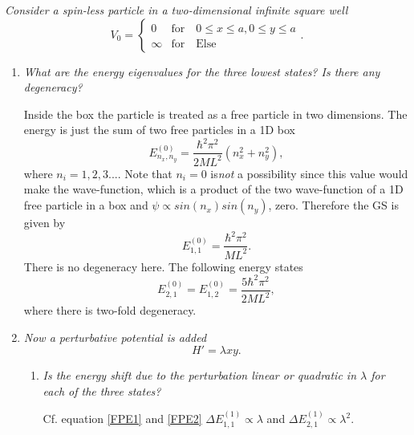 \begin{example}
	\emph{Consider a spin-less particle in a two-dimensional infinite square well}
	\begin{equation}
		V_0=\begin{cases} 0 &\mbox{for} \quad 0\leq x\leq a, 0\leq y \leq a \\ 
			\infty & \mbox{for} \quad \mbox{Else}  \end{cases}. 
	\end{equation} 
	
	\begin{enumerate}
		\item \emph{What are the energy eigenvalues for the three lowest states? Is there any degeneracy?}\newline
		
		Inside the box the particle is treated as a free particle in two dimensions. The energy is just the sum of two free particles in a 1D box
		\begin{equation}
			E_{n_x,n_y}^{(0)}=\frac{\hbar^2\pi^2}{2ML^2}(n_x^2+n_y^2),
		\end{equation} 
		where $n_i=1,2,3...$. Note that $n_i=0$ is\emph{not} a possibility since this value would make the wave-function, which is a product of the two wave-function of a 1D free particle in a box and $\psi\propto sin(n_x)sin(n_y)$, zero. Therefore the GS is given by
		\begin{equation}
			E_{1,1}^{(0)}=\frac{\hbar^2\pi^2}{ML^2}.
		\end{equation} 
		There is no degeneracy here. The following energy states
		\begin{equation}
			E_{2,1}^{(0)}=E_{1,2}^{(0)}=\frac{5\hbar^2\pi^2}{2ML^2},
		\end{equation} 
		where there is two-fold degeneracy. \newline
		
		\item \emph{Now a perturbative potential is added}
		\begin{equation}
			H'=\lambda xy.
		\end{equation} 
		\begin{enumerate}
			\item \emph{Is the energy shift due to the perturbation linear or quadratic in $\lambda$ for each of the three states?}\newline
			
			Cf. equation \eqref{FPE1} and \eqref{FPE2} $\Delta E_{1,1}^{(1)}\propto\lambda$ and $\Delta E_{2,1}^{(1)}\propto\lambda^2$.
			

\end{enumerate}
\end{enumerate}
\end{example}
